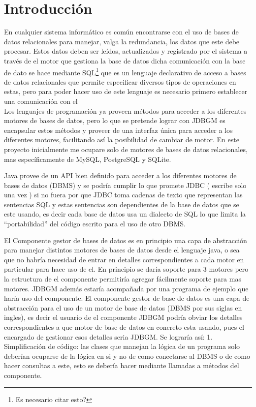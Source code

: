 \chapter{Introducción}
En cualquier sistema informático es común encontrarse con el uso de bases de datos relacionales para manejar, valga la redundancia, los datos que este debe procesar. Estos datos deben ser leídos, actualizados y registrado por el sistema a través de el motor que gestiona la base de datos dicha comunicación con la base de dato se hace mediante SQL\footnote{Es necesario citar esto?} que es un lenguaje declarativo de acceso a bases de datos relacionales que permite especificar diversos tipos de operaciones en estas, pero para poder hacer uso de este lenguaje es necesario primero establecer una comunicación con el \\


Los lenguajes de programación ya proveen métodos para acceder a los diferentes
motores de bases de datos, pero lo que se pretende lograr con JDBGM es encapsular estos
métodos y proveer de una interfaz única para acceder a los diferentes motores, facilitando
así la posibilidad de cambiar de motor. En este proyecto inicialmente me ocupare solo de
motores de bases de datos relacionales, mas específicamente de MySQL, PostgreSQL y
SQLite.


Java provee de un API bien definido para acceder a los diferentes motores de
bases de datos (DBMS) y se podría cumplir lo que promete JDBC ( escribe solo una
vez ) si no fuera por que JDBC toma cadenas de texto que representan las sentencias
SQL y estas sentencias son dependientes de la base de datos que se este usando, es
decir cada base de datos usa un dialecto de SQL lo que limita la “portabilidad” del
código escrito para el uso de otro DBMS.


El Componente gestor de bases de datos es en principio una capa de abstracción para manejar distintos motores de bases de datos desde el lenguaje java, o sea que no habría necesidad de entrar en detalles correspondientes a cada motor en particular para hace uso de el. En principio se daría soporte para 3 motores pero  la estructura de el componente permitiría agregar fácilmente soporte para mas motores. JDBGM además estaría acompañada por una programa de ejemplo que haría uso del componente.
 El componente gestor de base  de datos es una capa de abstracción para el uso de un motor de base de datos (DBMS por sus siglas en ingles), es decir el usuario de el componente JDBGM podría obviar los detalles correspondientes a que motor de base de datos en concreto esta usando, pues el encargado de gestionar esos detalles seria JDBGM. Se lograría así:
1. Simplificación de código: las clases que manejan la lógica de un programa solo deberían ocuparse de la lógica en si y no de como conectarse al DBMS o de como hacer consultas a este, esto se debería hacer mediante llamadas a métodos del componente.

